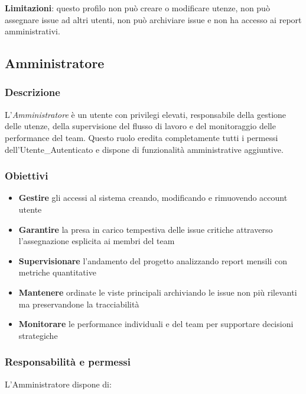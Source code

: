 \textbf{Limitazioni}: questo profilo non può creare o modificare utenze, non può assegnare issue ad altri utenti, non può archiviare issue e non ha accesso ai report amministrativi.

\newpage

\subsection{Amministratore}
\label{subsec:amministratore}

\subsubsection{Descrizione}
L'\textit{Amministratore} è un utente con privilegi elevati, responsabile della gestione delle utenze, della supervisione del flusso di lavoro e del monitoraggio delle performance del team. Questo ruolo eredita completamente tutti i permessi dell'Utente\_Autenticato e dispone di funzionalità amministrative aggiuntive.

\subsubsection{Obiettivi}
\begin{itemize}[leftmargin=1.1em]
\item \textbf{Gestire} gli accessi al sistema creando, modificando e rimuovendo account utente
\item \textbf{Garantire} la presa in carico tempestiva delle issue critiche attraverso l'assegnazione esplicita ai membri del team
\item \textbf{Supervisionare} l'andamento del progetto analizzando report mensili con metriche quantitative
\item \textbf{Mantenere} ordinate le viste principali archiviando le issue non più rilevanti ma preservandone la tracciabilità
\item \textbf{Monitorare} le performance individuali e del team per supportare decisioni strategiche
\end{itemize}

\subsubsection{Responsabilità e permessi}
L'Amministratore dispone di:

